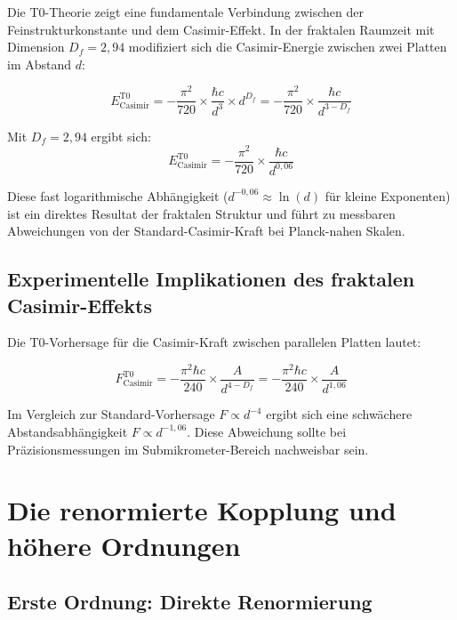 \documentclass[12pt,a4paper]{article}
\theoremstyle{definition}
\begin{document}
	Die T0-Theorie zeigt eine fundamentale Verbindung zwischen der Feinstrukturkonstante und dem Casimir-Effekt. In der fraktalen Raumzeit mit Dimension $D_f = 2{,}94$ modifiziert sich die Casimir-Energie zwischen zwei Platten im Abstand $d$:
	
	\begin{equation}
		E_{\text{Casimir}}^{\text{T0}} = -\frac{\pi^2}{720} \times \frac{\hbar c}{d^3} \times d^{D_f} = -\frac{\pi^2}{720} \times \frac{\hbar c}{d^{3-D_f}}
	\end{equation}
	
	Mit $D_f = 2{,}94$ ergibt sich:
	\begin{equation}
		E_{\text{Casimir}}^{\text{T0}} = -\frac{\pi^2}{720} \times \frac{\hbar c}{d^{0{,}06}}
	\end{equation}
	
	Diese fast logarithmische Abhängigkeit ($d^{-0{,}06} \approx \ln(d)$ für kleine Exponenten) ist ein direktes Resultat der fraktalen Struktur und führt zu messbaren Abweichungen von der Standard-Casimir-Kraft bei Planck-nahen Skalen.
	
	\subsection{Experimentelle Implikationen des fraktalen Casimir-Effekts}
	
	Die T0-Vorhersage für die Casimir-Kraft zwischen parallelen Platten lautet:
	
	\begin{equation}
		F_{\text{Casimir}}^{\text{T0}} = -\frac{\pi^2 \hbar c}{240} \times \frac{A}{d^{4-D_f}} = -\frac{\pi^2 \hbar c}{240} \times \frac{A}{d^{1{,}06}}
	\end{equation}
	
	Im Vergleich zur Standard-Vorhersage $F \propto d^{-4}$ ergibt sich eine schwächere Abstandsabhängigkeit $F \propto d^{-1{,}06}$. Diese Abweichung sollte bei Präzisionsmessungen im Submikrometer-Bereich nachweisbar sein.
	
	\section{Die renormierte Kopplung und höhere Ordnungen}
	
	\subsection{Erste Ordnung: Direkte Renormierung}
	
\end{document}
